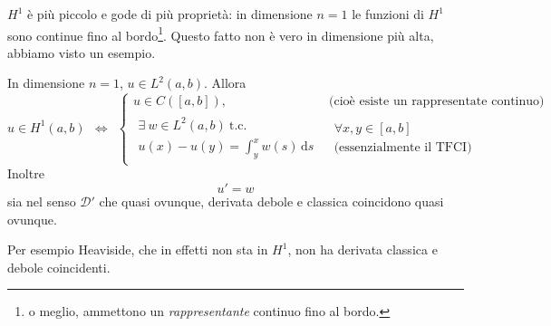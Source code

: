 \documentclass[10pt,a4paper,twoside,openright]{book}
\newcommand{\de}{\,\mathrm d}
\newcommand{\ds}{\de s}
\begin{document}
$H^{1}$ è più piccolo e gode di più proprietà: in dimensione $n=1$ le funzioni di $H^{1}$ sono continue fino al bordo\footnote{o meglio, ammettono un \textit{rappresentante} continuo fino al bordo.}. Questo fatto non è vero in dimensione più alta, abbiamo visto un esempio.
\begin{theorem}
    [Microteorema] In dimensione $n=1$, $u\in L^{2}(a,b)$. Allora
    \begin{equation*}
        u\in H^{1}(a,b) \ \ \Leftrightarrow \ \ \begin{cases}
            u\in C([ a,b]) ,            & \text{(cioè esiste un rappresentate continuo)} \\
            \begin{array}{l}
                \exists \ w\in L^{2}(a,b) \ \text{t.c.} \\
                u(x) -u(y) =\int ^{x}_{y} w(s) \ds
            \end{array} & \begin{array}{l}
                \forall x,y\in [ a,b] \\
                \text{(essenzialmente il TFCI)}
            \end{array}
        \end{cases}
    \end{equation*}
    Inoltre
    \begin{equation*}
        u'=w
    \end{equation*}
    sia nel senso $\mathcal{D} '$ che quasi ovunque, derivata debole e classica coincidono quasi ovunque.
\end{theorem}
Per esempio Heaviside, che in effetti non sta in $H^{1}$, non ha derivata classica e debole coincidenti.
\end{document}
